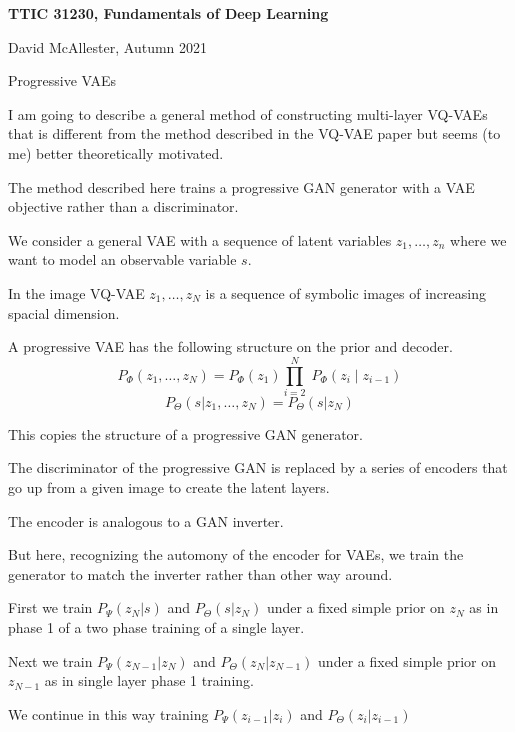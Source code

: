 





{\Huge

  \centerline{\bf TTIC 31230, Fundamentals of Deep Learning}
  \bigskip
  \centerline{David McAllester, Autumn 2021}
  \vfill
  \vfil
  \centerline{Progressive VAEs}
  \vfill
  \vfill

I am going to describe a general method of constructing multi-layer VQ-VAEs that is different from the method described in the VQ-VAE paper but seems (to me) better theoretically motivated.

\vfill
The method described here trains a progressive GAN generator with a VAE objective rather than a discriminator.


We consider a general VAE with a sequence of latent variables $z_1,\dots,z_n$ where we want to model an observable variable $s$.

\vfill
In the image VQ-VAE $z_1,\dots,z_N$ is a sequence of symbolic images of increasing spacial dimension.

\vfill
A progressive VAE has the following structure on the prior and decoder.
$$P_\Phi(z_1,\ldots,z_N) = P_\Phi(z_1)\prod_{i=2}^N\;P_\Phi(z_i\;|\;z_{i-1})$$
$$P_\Theta(s|z_1,\ldots,z_N) = P_\Theta(s|z_N)$$

\vfill
This copies the structure of a progressive GAN generator.


The discriminator of the progressive GAN is replaced by a series of encoders that go up from a given image to create the latent layers.

\vfill
The encoder is analogous to a GAN inverter.

\vfill
But here, recognizing the automony of the encoder for VAEs, we train the generator to match the inverter rather than other way around.

First we train $P_\Psi(z_N|s)$ and $P_\Theta(s|z_N)$ under a fixed simple prior on $z_N$ as in phase 1 of a two phase training of a single layer.

\vfill
Next we train $P_\Psi(z_{N-1}|z_N)$ and $P_\Theta(z_N|z_{N-1})$ under a fixed simple prior on $z_{N-1}$ as in single layer phase 1 training.

\vfill
We continue in this way training $P_\Psi(z_{i-1}|z_i)$ and $P_\Theta(z_i|z_{i-1})$


}
